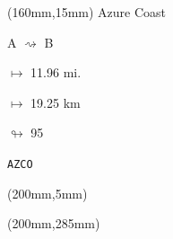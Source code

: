\begin{textblock*}{40mm}(160mm,15mm)%
Azure Coast
\par A $\rightsquigarrow$ B
\Large
\par$\mapsto$ 11.96 mi.
\par$\mapsto$ 19.25 km
\par$\looparrowright$ 95
\par\hfill\tiny\tt AZCO\\
\end{textblock*}
\begin{textblock*}{20mm}(200mm,5mm)%
\fbox{\thepage}
\end{textblock*}
\begin{textblock*}{20mm}(200mm,285mm)%
\fbox{\thepage}
\end{textblock*}
\null\newpage


